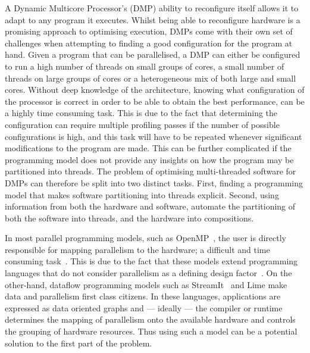 A Dynamic Multicore Processor's (DMP) ability to reconfigure itself allows it to adapt to any program it executes.
Whilst being able to reconfigure hardware is a promising approach to optimising execution, DMPs come with their own set of challenges when attempting to finding a good configuration for the program at hand.
Given a program that can be parallelised, a DMP can either be configured to run a high number of threads on small groups of cores, a small number of threads on large groups of cores or a heterogeneous mix of both large and small cores.
Without deep knowledge of the architecture, knowing what configuration of the processor is correct in order to be able to obtain the best performance, can be a highly time consuming task.
This is due to the fact that determining the configuration can require multiple profiling passes if the number of possible configurations is high, and this task will have to be repeated whenever significant modifications to the program are made.
This can be further complicated if the programming model does not provide any insights on how the program may be partitioned into threads.
The problem of optimising multi-threaded software for DMPs can therefore be split into two distinct tasks.
First, finding a programming model that makes software partitioning into threads explicit.
Second, using information from both the hardware and software, automate the partitioning of both the software into threads, and the hardware into compositions.

In most parallel programming models, such as OpenMP~\cite{openmp}, the user is directly responsible for mapping parallelism to the hardware; a difficult and time consuming task~\cite{prabhu2011LanguagePar}.
This is due to the fact that these models extend programming languages that do not consider parallelism as a defining design factor~\cite{pingaliTao2011}.
On the other-hand, dataflow programming models such as StreamIt~\cite{theis2002streamit} and Lime \cite{auerbach2012lime} make data and parallelism first class citizens.
In these languages, applications are expressed as data oriented graphs and --- ideally --- the compiler or runtime determines the mapping of parallelism onto the available hardware and controls the grouping of hardware resources.
Thus using such a model can be a potential solution to the first part of the problem.


